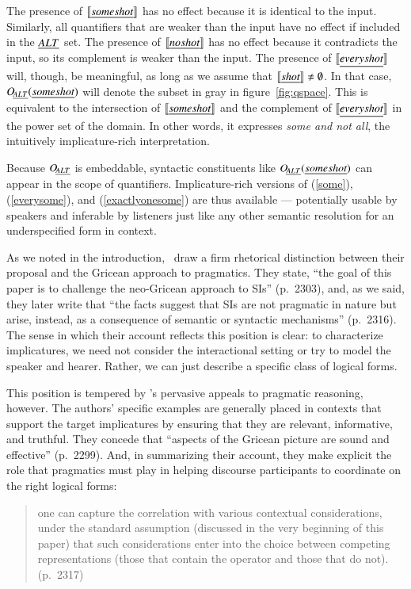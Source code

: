 \documentclass[leqno,12pt]{article}
\newcommand{\CFS}{\citetalias{ChierchiaFoxSpector08}}
\newcommand{\figref}[1]{figure~\ref{#1}}
\newcommand{\eg}[1]{(\ref{#1})}
\newcommand{\word}[1]{\emph{#1}}
\newcommand{\sem}[1]{\ensuremath{\llbracket#1\rrbracket}}
\newcommand{\ALT}{\emph{ALT}}
\newcommand{\OALT}{\mathop{O\negthinspace_{\ALT}}}
\begin{document}
{The presence of $\sem{\word{some shot\/}}$ has no effect because it is
identical to the input. Similarly, all quantifiers that are weaker
than the input have no effect if included in the $\ALT$ set. The
presence of $\sem{\word{no shot\/}}$ has no effect because it
contradicts the input, so its complement is weaker than the input.
The presence of $\sem{\word{every shot\/}}$ will, though, be meaningful,
as long as we assume that $\sem{\word{shot\/}} \neq \emptyset$.  In that
case, $\OALT(\word{some shot\/})$ will denote the subset in gray in
\figref{fig:qspace}.  This is equivalent to the intersection of
$\sem{\word{some shot\/}}$ and the complement of
$\sem{\word{every shot\/}}$ in the power set of the domain.  In other
words, it expresses \word{some and not all}, the intuitively
implicature-rich interpretation.

Because $\OALT$ is embeddable, syntactic constituents like
$\OALT(\word{some shot})$ can appear in the scope of quantifiers.
Implicature-rich versions of \eg{some}, \eg{everysome}, and
\eg{exactlyonesome} are thus available --- potentially usable by
speakers and inferable by listeners just like any other semantic
resolution for an underspecified form in context.

As we noted in the introduction, \CFS\ draw a firm rhetorical
distinction between their proposal and the Gricean approach to
pragmatics. They state, ``the goal of this paper is to challenge the
neo-Gricean approach to SIs'' (p.~2303), and, as we said, they later
write that ``the facts suggest that SIs are not pragmatic in nature
but arise, instead, as a consequence of semantic or syntactic
mechanisms'' (p.~2316). The sense in which their account reflects this
position is clear: to characterize implicatures, we need not consider
the interactional setting or try to model the speaker and
hearer. Rather, we can just describe a specific class of logical
forms.

This position is tempered by \CFS's pervasive appeals to
pragmatic reasoning, however.  The authors' specific examples are generally
placed in contexts that support the target implicatures by ensuring
that they are relevant, informative, and truthful.  They concede that
``aspects of the Gricean picture are sound and effective''
(p.~2299). And, in summarizing their account, they make explicit the
role that pragmatics must play in helping discourse
participants to coordinate on the right logical forms:
%
\begin{quote}
  one can capture the correlation with various contextual
  considerations, under the standard assumption (discussed in the very
  beginning of this paper) that such considerations enter into the
  choice between competing representations (those that contain the
  operator and those that do not). (p.~2317)
\end{quote}

}
\end{document}
